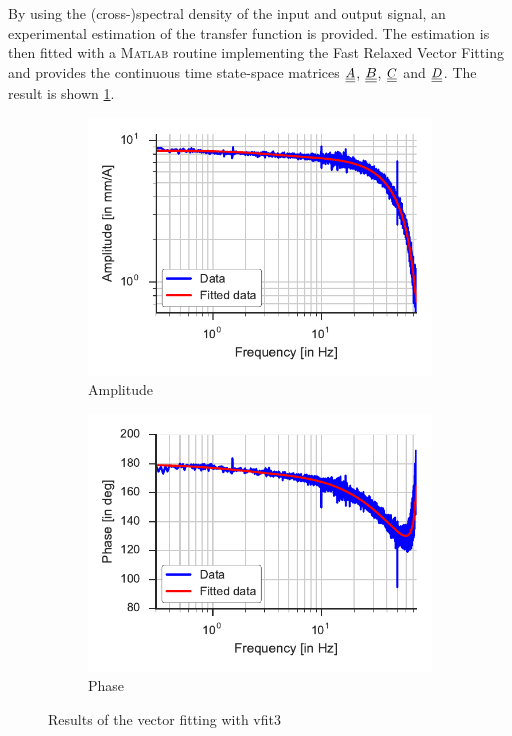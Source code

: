By using the (cross-)spectral density of the input and output signal, an experimental estimation of the transfer function is provided. The estimation is then fitted with a \textsc{Matlab} routine implementing the Fast Relaxed Vector Fitting \cite{art:vfit3-1, art:vfit3-2, art:vfit3-3, web:vfit3} and provides the continuous time state-space matrices $\underline{\underline{A}}$, $\underline{\underline{B}}$, $\underline{\underline{C}}$ and $\underline{\underline{D}}$. The result is shown \cref{fig:ctl_vfit3}.

\begin{figure}
	\begin{subfigure}[t]{0.5\linewidth}
		\includegraphics[width=1\linewidth]{img/ctl_id_amplitude}
		\caption{Amplitude}
	\end{subfigure}
	\hfill
	\begin{subfigure}[t]{0.5\linewidth}
		\includegraphics[width=1\linewidth]{img/ctl_id_phase}
		\caption{Phase}
	\end{subfigure}
	\caption{\label{fig:ctl_vfit3}Results of the vector fitting with vfit3}
\end{figure}

